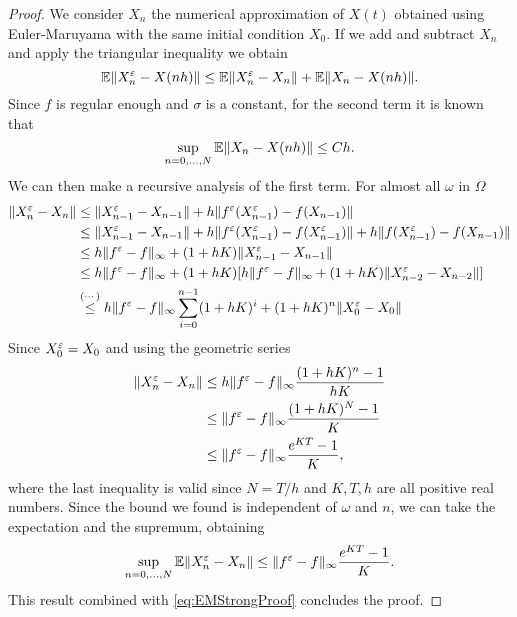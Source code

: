 \begin{proof} We consider $X_n$ the numerical approximation of $X(t)$ obtained using Euler-Maruyama with the same initial condition $X_0$. If we add and subtract $X_n$ and apply the triangular inequality we obtain
\begin{equation*}
	\mathbb{E} \|X_n^\varepsilon - X(nh)\| \leq \mathbb{E} \|X_n^\varepsilon - X_n\| + \mathbb{E} \|X_n - X(nh)\|. \\
\end{equation*}
Since $f$ is regular enough and $\sigma$ is a constant, for the second term it is known that
\begin{equation}\label{eq:EMStrongProof}
	\sup_{n = 0, \dots, N} \mathbb{E} \|X_n - X(nh)\| \leq C h.
\end{equation}
We can then make a recursive analysis of the first term. For almost all $\omega$ in $\Omega$
\begin{equation*}
\begin{aligned}
	\|X^\varepsilon_n - X_n\| &\leq \|X_{n-1}^\varepsilon - X_{n-1}\| + h\|f^\varepsilon(X^\varepsilon_{n-1}) - f(X_{n-1})\|  \\
	&\leq \|X_{n-1}^\varepsilon - X_{n-1}\| + h\|f^\varepsilon(X^\varepsilon_{n-1}) - f(X^\varepsilon_{n-1})\| + h\|f(X^\varepsilon_{n-1}) - f(X_{n-1})\| \\
	&\leq h  \|f^\varepsilon - f\|_{\infty} + (1 + hK) \|X_{n-1}^\varepsilon - X_{n-1}\| \\
	&\leq h  \|f^\varepsilon - f\|_{\infty} + (1 + hK) [h  \|f^\varepsilon - f\|_{\infty} + (1 + hK)\|X_{n-2}^\varepsilon - X_{n-2}\|] \\
	&\stackrel{(\cdots)}{\leq} h  \|f^\varepsilon - f\|_{\infty} \sum_{i = 0}^{n-1} (1 + hK)^i + (1 + hK)^n \|X_0^\varepsilon - X_0\|
\end{aligned}
\end{equation*}
Since $X_0^\varepsilon = X_0$ and using the geometric series
\begin{equation*}
\begin{aligned}
	\|X^\varepsilon_n - X_n\| &\leq h  \|f^\varepsilon - f\|_{\infty} \frac{(1 + hK)^n - 1}{hK} \\
	&\leq  \|f^\varepsilon - f\|_{\infty} \frac{(1 + hK)^N - 1}{K} \\
	&\leq  \|f^\varepsilon - f\|_{\infty} \frac{e^{KT} - 1}{K},
\end{aligned}
\end{equation*}
where the last inequality is valid since $N = T/h$ and $K, T, h$ are all positive real numbers. Since the bound we found is independent of $\omega$ and $n$, we can take the expectation and the supremum, obtaining
\begin{equation}\label{eq:DiffXeplnXn}
	\sup_{n = 0, \dots, N} \mathbb{E} \|X^\varepsilon_n - X_n\| \leq  \|f^\varepsilon - f\|_{\infty} \frac{e^{KT} - 1}{K}.
\end{equation}
This result combined with \eqref{eq:EMStrongProof} concludes the proof.
\end{proof}
